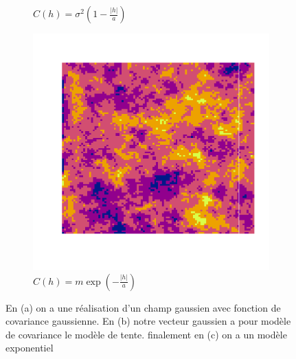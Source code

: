 \documentclass[10pt]{article} %
\begin{document}
\begin{figure}[h!]
\begin{subfigure}[b]{0.3\textwidth}
        \caption{$C(h) = \sigma^2(1 - \frac{|h|}{a})$}
        \label{fig:three sin x}
    \end{subfigure}
    \hfill
    \begin{subfigure}[b]{0.3\textwidth}
        \centering
        \includegraphics[width=\textwidth]{media/exp6_1.png}
        \caption{$C(h) = m \exp (-\frac{|h|}{a})$}
        \label{fig:five over x}
    \end{subfigure}
       \caption{En (a) on a une réalisation d'un champ gaussien avec fonction de covariance gaussienne. En (b) notre vecteur gaussien a pour modèle de covariance le modèle de tente.
       finalement en (c) on a un modèle exponentiel}
       \label{fig:three graphs}
\end{figure}

\newpage
\end{document}
